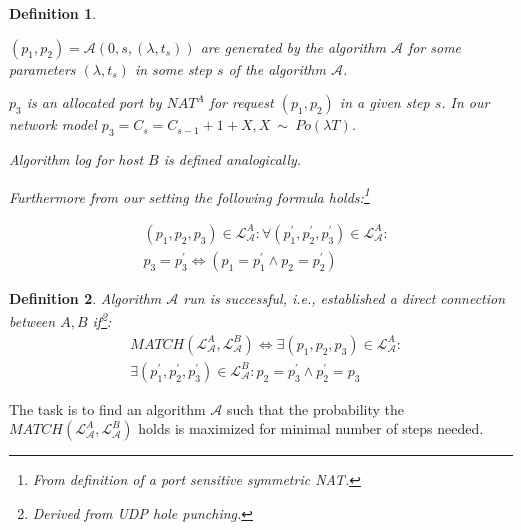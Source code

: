 \documentclass[twoside]{article}
\newtheorem{mydef}{Definition}
\begin{document}
\begin{multicols}{2}
\begin{mydef}
\begin{compactitem}
 \item $(p_1, p_2) = \mathcal{A}(0, s, (\lambda, t_s)) $ are generated by the algorithm $\mathcal{A}$ for some 
       parameters $(\lambda, t_s)$ in some step $s$ of the algorithm $\mathcal{A}$.
 \item $p_3$ is an allocated port by $NAT^A$ for request $(p_1, p_2)$ in a given step $s$. In our network model
       $p_3=C_s=C_{s-1} + 1 + X, X~\sim~Po(\lambda T)$.
 \item Algorithm log for host $B$ is defined analogically.
 \item Furthermore from our setting the following formula holds:\footnote{From definition of a port sensitive symmetric NAT.}
\end{compactitem} %
%
%
\begin{align*}
& (p_1, p_2, p_3) \in \mathcal{L}^A_{\mathcal{A}}: \forall (p_1^{\prime}, p_2^{\prime}, p_3^{\prime}) \in \mathcal{L}^{A}_{\mathcal{A}} :\\
& p_3 = p_3^{\prime} \Leftrightarrow \left( p_1=p^{\prime}_1 \wedge p_2=p^{\prime}_2 \right)
\end{align*}
\end{mydef}

\begin{mydef}
\label{def:match}
Algorithm $\mathcal{A}$ run is successful, i.e., established a direct connection between $A,B$ if\footnote{Derived from UDP hole punching.}:
\begin{align*}
& MATCH(\mathcal{L}^{A}_{\mathcal{A}}, \mathcal{L}^{B}_{\mathcal{A}}) \Leftrightarrow \exists(p_1, p_2, p_3) \in \mathcal{L}^{A}_{\mathcal{A}}: \\
& \exists(p_1^{\prime}, p_2^{\prime}, p_3^{\prime}) \in \mathcal{L}^{B}_{\mathcal{A}}: p_2 = p_3^{\prime} \wedge p_2^{\prime} = p_3
%
\end{align*}
\end{mydef}
The task is to find an algorithm $\mathcal{A}$ such that the probability the $MATCH(\mathcal{L}^{A}_{\mathcal{A}}, \mathcal{L}^{B}_{\mathcal{A}})$
holds is maximized for minimal number of steps needed.


\end{multicols}
\end{document}
